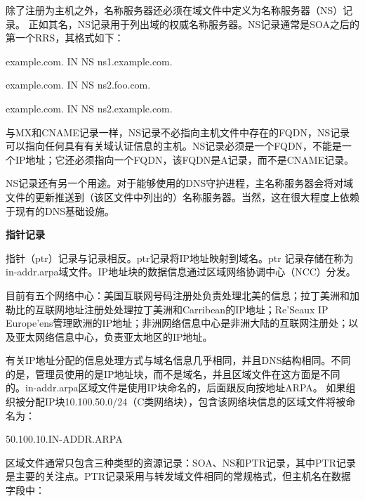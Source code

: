 ﻿\documentclass[english,runningheads,a4paper]{llncs}[2018/03/10]
\begin{document}
\par\noindent 除了注册为主机之外，名称服务器还必须在域文件中定义为名称服务器（NS）记录。
正如其名，NS记录用于列出域的权威名称服务器。NS记录通常是SOA之后的第一个RRS，其格式如下：
\par\setlength\parindent{2em}example.com. \qquad IN \qquad NS \qquad ns1.example.com.

\par\setlength\parindent{2em}example.com. \qquad IN \qquad NS \qquad ns2.foo.com.

\par\setlength\parindent{2em}example.com. \qquad IN \qquad NS \qquad ns2.example.com.

与MX和CNAME记录一样，NS记录不必指向主机文件中存在的FQDN，NS记录可以指向任何具有有关域认证信息的主机。NS记录必须是一个FQDN，不能是一个IP地址；它还必须指向一个FQDN，该FQDN是A记录，而不是CNAME记录。

NS记录还有另一个用途。对于能够使用的DNS守护进程，主名称服务器会将对域文件的更新推送到（该区文件中列出的）名称服务器。当然，这在很大程度上依赖于现有的DNS基础设施。

\vbox{}

\par\noindent\textbf{指针记录}

\par\noindent 指针（ptr）记录与记录相反。ptr记录将IP地址映射到域名。ptr 记录存储在称为in-addr.arpa域文件。IP地址块的数据信息通过区域网络协调中心（NCC）分发。

\par\setlength\parindent{2em}目前有五个网络中心：美国互联网号码注册处负责处理北美的信息；拉丁美洲和加勒比的互联网地址注册处处理拉丁美洲和Carribean的IP地址；Re'Seaux IP Europe'ens管理欧洲的IP地址；非洲网络信息中心是非洲大陆的互联网注册处；以及亚太网络信息中心，负责亚太地区的IP地址。

\par\setlength\parindent{2em}有关IP地址分配的信息处理方式与域名信息几乎相同，并且DNS结构相同。不同的是，管理员使用的是IP地址块，而不是域名，并且区域文件在这方面是不同的。in-addr.arpa区域文件是使用IP块命名的，后面跟反向按地址ARPA。 如果组织被分配IP块10.100.50.0/24（C类网络块），包含该网络块信息的区域文件将被命名为：

\par\setlength\parindent{2em}50.100.10.IN-ADDR.ARPA

\par\setlength\parindent{2em}区域文件通常只包含三种类型的资源记录：SOA、NS和PTR记录，其中PTR记录是主要的关注点。PTR记录采用与转发域文件相同的常规格式，但主机名在数据字段中：
\end{document}

